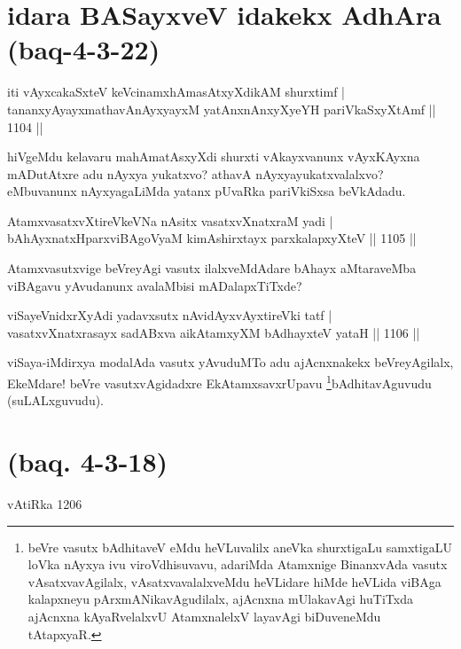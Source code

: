 \section*{idara BASayxveV idakekx AdhAra (baq-4-3-22)}


\begin{shl}
iti vAyxcakaSxteV keVcinamxhAmasAtxyXdikAM shurxtimf | \\
tananxyAyayxmathavA\s nAyxyayxM yatAnxnAnxyXyeYH pariVkaSxyXtAmf \hfill ||  1104 ||  
\end{shl}

\begin{artha}
hiVgeMdu kelavaru mahAmatAsxyXdi shurxti vAkayxvanunx vAyxKAyxna mADutAtxre adu nAyxya yukatxvo? athavA nAyxyayukatxvalalxvo? eMbuvanunx nAyxyagaLiMda yatanx pUvaRka pariVkiSxsa beVkAdadu.
\end{artha}


\begin{shl}
AtamxvasatxvXtireVkeVNa nAsitx vasatxvXnatxraM yadi | \\
bAhAyxnatxHparxviBAgoV\s yaM kimAshirxtayx parxkalapxyXteV \hfill||  1105 ||  
\end{shl}

\begin{artha}
Atamxvasutxvige beVreyAgi vasutx ilalxveMdAdare bAhayx aMtaraveMba viBAgavu yAvudanunx avalaMbisi mADalapxTiTxde?
\end{artha}


\begin{shl}
viSayeVnidxrXyAdi yadavxsutx nAvidAyxvAyxtireVki tatf | \\
vasatxvXnatxrasayx sadABxva aikAtamxyXM bAdhayxteV yataH \hfill||  1106 ||  
\end{shl}

\begin{artha}
viSaya-iMdirxya modalAda vasutx yAvuduMTo adu ajAcnxnakekx beVreyAgilalx, EkeMdare! beVre vasutxvAgidadxre EkAtamxsavxrUpavu \footnote{beVre vasutx bAdhitaveV eMdu heVLuvalilx aneVka shurxtigaLu samxtigaLU loVka nAyxya ivu viroVdhisuvavu, adariMda Atamxnige BinanxvAda vasutx vAsatxvavAgilalx, vAsatxvavalalxveMdu heVLidare hiMde heVLida viBAga kalapxneyu pArxmANikavAgudilalx, ajAcnxna mUlakavAgi huTiTxda ajAcnxna kAyaRvelalxvU AtamxnalelxV layavAgi biDuveneMdu tAtapxyaR.}bAdhitavAguvudu (suLALxguvudu).
\end{artha}

\section*{(baq. 4-3-18)} vAtiRka 1206

